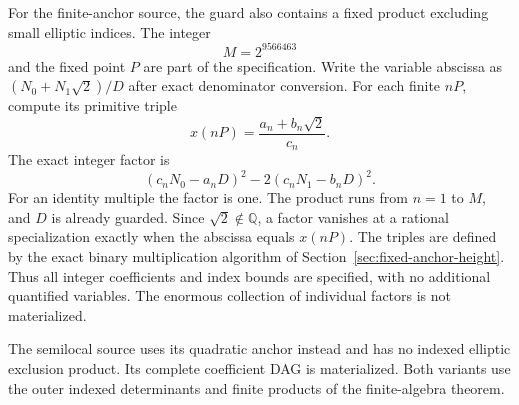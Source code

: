 \documentclass[11pt]{article}
\theoremstyle{definition}
\begin{document}
For the finite-anchor source, the guard also contains a fixed
product excluding small elliptic indices.  The integer
\[
                             M=2^{9566463}
\]
and the fixed point $P$ are part of the specification.  Write the
variable abscissa as $(N_0+N_1\sqrt2)/D$ after exact denominator
conversion.  For each finite $nP$, compute its primitive triple
\[
                        x(nP)=\frac{a_n+b_n\sqrt2}{c_n}.
\]
The exact integer factor is
\[
                  (c_nN_0-a_nD)^2-2(c_nN_1-b_nD)^2.
\]
For an identity multiple the factor is one.  The product runs
from $n=1$ to $M$, and $D$ is already guarded.  Since
$\sqrt2\notin\mathbb Q$, a factor vanishes at a rational
specialization exactly when the abscissa equals $x(nP)$.
The triples are defined by the exact binary multiplication
algorithm of Section~\ref{sec:fixed-anchor-height}.  Thus all
integer coefficients and index bounds are specified, with no
additional quantified variables.  The enormous collection of
individual factors is not materialized.

The semilocal source uses its quadratic anchor instead and has
no indexed elliptic exclusion product.  Its complete coefficient
DAG is materialized.  Both variants use the outer indexed
determinants and finite products of the finite-algebra theorem.
\end{document}
